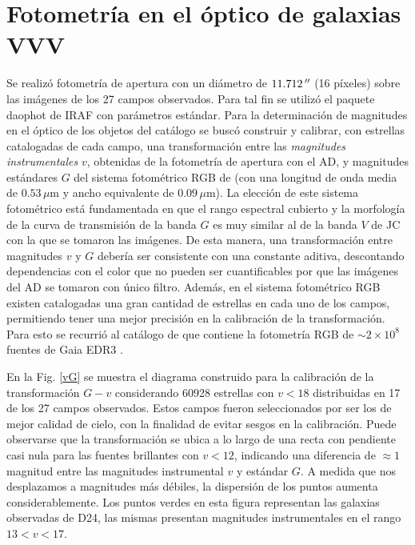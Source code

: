 \documentclass[baaa]{baaa}
\begin{document}
\section{Fotometría en el óptico de galaxias VVV}
Se realizó fotometría de apertura con un diámetro de $11.712\,\hbox{$^{\prime\prime}$}$ (16 píxeles) sobre las imágenes de los 27 campos observados. Para tal fin se utilizó el paquete {\sc daophot} de {\sc IRAF} \citep{ref-iraf} con parámetros estándar. Para la determinación de magnitudes en el óptico de los objetos del catálogo se buscó construir y calibrar, con estrellas catalogadas de cada campo, una transformación entre las \textit{magnitudes instrumentales} $v$, obtenidas de la fotometría de apertura con el AD, y magnitudes estándares $G$ del sistema fotométrico RGB de \cite{cardiel2021} (con una longitud de onda media de $0.53\,\mu\mathrm{m}$ y ancho equivalente de $0.09\,\mu\mathrm{m}$).
La elección de este sistema fotométrico está fundamentada en que el rango espectral cubierto y la morfología de la curva de transmisión de la banda $G$ es muy similar al de la banda $V$ de JC con la que se tomaron las imágenes. De esta manera, una transformación entre magnitudes $v$ y $G$ debería ser consistente con una constante aditiva, descontando dependencias con el color que no pueden ser cuantificables por que las imágenes del AD se tomaron con único filtro. 
Además, en el sistema fotométrico RGB existen catalogadas una gran cantidad de estrellas en cada uno de los campos, permitiendo tener una mejor precisión en la calibración de la transformación. Para esto se recurrió al catálogo de \cite{carrasco2023} que contiene la fotometría RGB de $\sim2\times10^8$ fuentes de Gaia EDR3 \citep{GAIAEDR32021}. 

En la Fig. \ref{vG} se muestra el diagrama construido para la calibración de la transformación $G-v$ considerando 60928 estrellas con $v<18$ distribuidas en 17 de los 27 campos observados. Estos campos fueron seleccionados por ser los de mejor calidad de cielo, con la finalidad de evitar sesgos en la calibración. Puede observarse que la transformación se ubica a lo largo de una recta con pendiente casi nula para las fuentes brillantes con $v<12$, indicando una diferencia de $\approx1$ magnitud entre las magnitudes instrumental $v$ y estándar $G$. A medida que nos desplazamos a magnitudes más débiles, la dispersión de los puntos aumenta considerablemente. Los puntos verdes en esta figura representan las galaxias observadas de D24, las mismas presentan magnitudes instrumentales en el rango  $13<v<17$.
\end{document}
